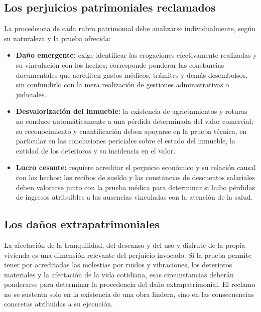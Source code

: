\documentclass[12pt,oneside]{book}
\begin{document}

\subsection{Los perjuicios patrimoniales reclamados}

La procedencia de cada rubro patrimonial debe analizarse individualmente, seg\'un su naturaleza y la prueba ofrecida:

\begin{itemize}
    \item \textbf{Da\~no emergente:} exige identificar las erogaciones efectivamente realizadas y su vinculaci\'on con los hechos; corresponde ponderar las constancias documentales que acrediten gastos m\'edicos, tr\'amites y dem\'as desembolsos, sin confundirlo con la mera realizaci\'on de gestiones administrativas o judiciales.
    \item \textbf{Desvalorizaci\'on del inmueble:} la existencia de agrietamientos y roturas no conduce autom\'aticamente a una p\'erdida determinada del valor comercial; su reconocimiento y cuantificaci\'on deben apoyarse en la prueba t\'ecnica, en particular en las conclusiones periciales sobre el estado del inmueble, la entidad de los deterioros y su incidencia en el valor.
    \item \textbf{Lucro cesante:} requiere acreditar el perjuicio econ\'omico y su relaci\'on causal con los hechos; los recibos de sueldo y las constancias de descuentos salariales deben valorarse junto con la prueba m\'edica para determinar si hubo p\'erdidas de ingresos atribuibles a las ausencias vinculadas con la atenci\'on de la salud.
\end{itemize}

\subsection{Los da\~nos extrapatrimoniales}

La afectaci\'on de la tranquilidad, del descanso y del uso y disfrute de la propia vivienda es una dimensi\'on relevante del perjuicio invocado. Si la prueba permite tener por acreditadas las molestias por ruidos y vibraciones, los deterioros materiales y la afectaci\'on de la vida cotidiana, esas circunstancias deber\'an ponderarse para determinar la procedencia del da\~no extrapatrimonial. El reclamo no se sustenta solo en la existencia de una obra lindera, sino en las consecuencias concretas atribuidas a su ejecuci\'on.
\end{document}
